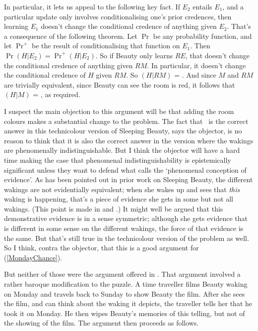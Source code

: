 In particular, it lets us appeal to the following key fact. If $E_2$ entails $E_1$, and a particular update only involves conditionalising one's prior credences, then learning $E_1$ doesn't change the conditional credence of anything given $E_2$. That's a consequence of the following theorem. Let $\Pr$ be any probability function, and let $\Pr^+$ be the result of conditionalising that function on $E_1$. Then $\Pr(H | E_2) = \Pr^+(H | E_2)$. So if Beauty only learns $RE$, that doesn't change the conditional credence of anything given $RM$. In particular, it doesn't change the conditional credence of $H$ given $RM$. So $(H | RM)$ = \half. And since $M$ and $RM$ are trivially equivalent, since Beauty can see the room is red, it follows that $(H | M)$ = \half, as required.

I suspect the main objection to this argument will be that adding the room colours makes a substantial change to the problem. The fact that \third\ is the correct answer in this technicolour version of Sleeping Beauty, says the objector, is no reason to think that it is also the correct answer in the version where the wakings are phenomenally indistinguishable. But I think the objector will have a hard time making the case that phenomenal indistinguishability is epistemically significant unless they want to defend what \citet{Williamson2007-WILTPO-17} calls the `phenomenal conception of evidence'. As has been pointed out in prior work on Sleeping Beauty, the different wakings are not evidentially equivalent; when she wakes up and sees that \textit{this} waking is happening, that's a piece of evidence she gets in some but not all wakings. (This point is made in \citet{Weintraub2004} and \citet{Stalnaker2008}.) It might well be argued that this demonstrative evidence is in a sense symmetric; although she gets evidence that is different in some sense on the different wakings, the force of that evidence is the same. But that's still true in the technicolour version of the problem as well. So I think, contra the objector, that this is a good argument for (\ref{MondayChance}).

But neither of those were the argument offered in \citet{Weatherson-SoSB}. That argument involved a rather baroque modification to the puzzle. A time traveller films Beauty waking on Monday and travels back to Sunday to show Beauty the film. After she sees the film, and can think about the waking it depicts, the traveller tells her that he took it on Monday. He then wipes Beauty's memories of this telling, but not of the showing of the film. The argument then proceeds as follows.

